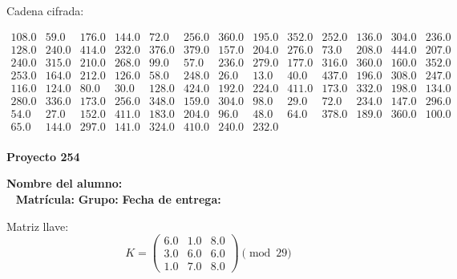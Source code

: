 \documentclass[12pt]{article}
\begin{document}
Cadena cifrada:
\begin{center}
$\begin{array}{lllllllllllll}
108.0 & 59.0 & 176.0 & 144.0 & 72.0 & 256.0 & 360.0 & 195.0 & 352.0 & 252.0 & 136.0 & 304.0 & 236.0\\
128.0 & 240.0 & 414.0 & 232.0 & 376.0 & 379.0 & 157.0 & 204.0 & 276.0 & 73.0 & 208.0 & 444.0 & 207.0\\
240.0 & 315.0 & 210.0 & 268.0 & 99.0 & 57.0 & 236.0 & 279.0 & 177.0 & 316.0 & 360.0 & 160.0 & 352.0\\
253.0 & 164.0 & 212.0 & 126.0 & 58.0 & 248.0 & 26.0 & 13.0 & 40.0 & 437.0 & 196.0 & 308.0 & 247.0\\
116.0 & 124.0 & 80.0 & 30.0 & 128.0 & 424.0 & 192.0 & 224.0 & 411.0 & 173.0 & 332.0 & 198.0 & 134.0\\
280.0 & 336.0 & 173.0 & 256.0 & 348.0 & 159.0 & 304.0 & 98.0 & 29.0 & 72.0 & 234.0 & 147.0 & 296.0\\
54.0 & 27.0 & 152.0 & 411.0 & 183.0 & 204.0 & 96.0 & 48.0 & 64.0 & 378.0 & 189.0 & 360.0 & 100.0\\
65.0 & 144.0 & 297.0 & 141.0 & 324.0 & 410.0 & 240.0 & 232.0\\
\end{array}$
\end{center}

\newpage


\textbf{Proyecto 254}

\textbf{Nombre del alumno:} \underline{\hspace{13cm}}\\\
\vspace{1cm}
\textbf{Matrícula:} \underline{\hspace{4cm}} \hspace{1cm}
\textbf{Grupo:} \underline{\hspace{2cm}}
\textbf{Fecha de entrega:} \underline{\hspace{2cm}}

\medskip

Matriz llave:
\[
K = \begin{pmatrix}
6.0 & 1.0 & 8.0\\
3.0 & 6.0 & 6.0\\
1.0 & 7.0 & 8.0
\end{pmatrix} \pmod{29}
\]
\end{document}
